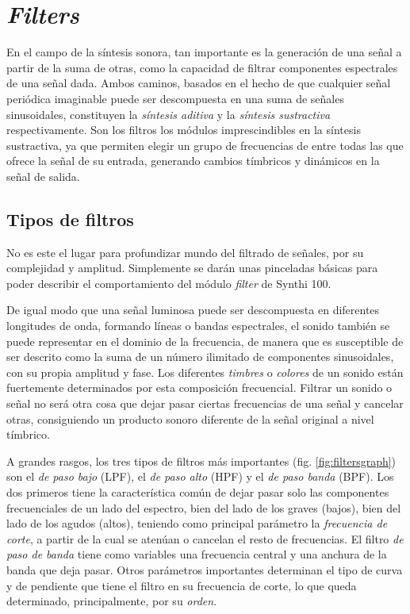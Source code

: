 \section{\textit{Filters}}

En el campo de la síntesis sonora, tan importante es la generación de una señal a partir de la suma de otras, como la capacidad de filtrar componentes espectrales de una señal dada. Ambos caminos, basados en el hecho de que cualquier señal periódica imaginable puede ser descompuesta en una suma de señales sinusoidales, constituyen la \textit{síntesis aditiva} y la \textit{síntesis sustractiva} respectivamente. Son los filtros los módulos imprescindibles en la síntesis sustractiva, ya que permiten elegir un grupo de frecuencias de entre todas las que ofrece la señal de su entrada, generando cambios tímbricos y dinámicos en la señal de salida.

\subsection{Tipos de filtros}

No es este el lugar para profundizar mundo del filtrado de señales, por su complejidad y amplitud. Simplemente se darán unas pinceladas básicas para poder describir el comportamiento del módulo \textit{filter} de Synthi 100.

De igual modo que una señal luminosa puede ser descompuesta en diferentes longitudes de onda, formando líneas o bandas espectrales, el sonido también se puede representar en el dominio de la frecuencia, de manera que es susceptible de ser descrito como la suma de un número ilimitado de componentes sinusoidales, con su propia amplitud y fase. Los diferentes \textit{timbres} o \textit{colores} de un sonido están fuertemente determinados por esta composición frecuencial. Filtrar un sonido o señal no será otra cosa que dejar pasar ciertas frecuencias de una señal y cancelar otras, consiguiendo un producto sonoro diferente de la señal original a nivel tímbrico.

A grandes rasgos, los tres tipos de filtros más importantes (fig. \ref{fig:filtersgraph}) son el \textit{de paso bajo} (LPF), el \textit{de paso alto} (HPF) y el \textit{de paso banda} (BPF). Los dos primeros tiene la característica común de dejar pasar solo las componentes frecuenciales de un lado del espectro, bien del lado de los graves (bajos), bien del lado de los agudos (altos), teniendo como principal parámetro la \textit{frecuencia de corte}, a partir de la cual se atenúan o cancelan el resto de frecuencias. El filtro \textit{de paso de banda} tiene como variables una frecuencia central y una anchura de la banda que deja pasar. Otros parámetros importantes determinan el tipo de curva y de pendiente que tiene el filtro en su frecuencia de corte, lo que queda determinado, principalmente, por su \textit{orden}. 

